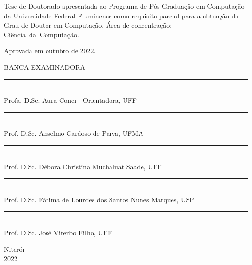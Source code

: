 \noindent
\begin{flushright}
\begin{minipage}[t]{8cm}

Tese de Doutorado apresentada ao Programa de P\'{o}s-Gradua\c{c}\~{a}o em Computa\c{c}\~{a}o da Universidade Federal Fluminense como requisito parcial para a obten\c{c}\~{a}o do \mbox{Grau} de Doutor em Computa\c{c}\~{a}o. \'{A}rea de concentra\c{c}\~{a}o: \mbox{Ciência da Computação.} %

\end{minipage}
\end{flushright}
\vspace{1.0 cm}
\noindent
Aprovada em outubro de 2022. \\
\begin{flushright}
  {
  \begin{center}
  BANCA EXAMINADORA \\
  \vspace{6mm}
  \rule{11cm}{.1mm} \\
    Profa. D.Sc. Aura Conci - Orientadora, UFF \\
    \vspace{6mm}
  \rule{11cm}{.1mm} \\
    Prof. D.Sc. Anselmo Cardoso de Paiva, UFMA\\
    \vspace{6mm}
  \rule{11cm}{.1mm} \\
    Prof. D.Sc. Débora Christina Muchaluat Saade, UFF\\
  \vspace{4mm}
  \rule{11cm}{.1mm} \\
    Prof. D.Sc. Fátima de Lourdes dos Santos Nunes Marques, USP\\
    \vspace{6mm}
  \rule{11cm}{.1mm} \\
    Prof. D.Sc. José Viterbo Filho, UFF\\
  \vspace{6mm}
  \end{center}
  }
\end{flushright}
\begin{center}
  \vspace{4mm}
  Niter\'{o}i \\
  2022

\end{center}

\cleardoublepage
\thispagestyle{empty}
\vspace*{200mm}

